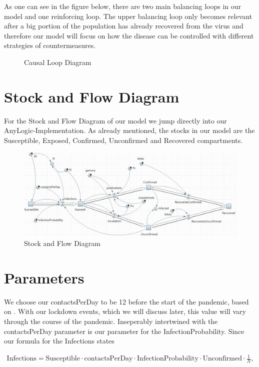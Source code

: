 \documentclass
[
    a4paper,
    11pt,
    bibliography = totoc,
    listof = totoc,
    headinclude = true,
]
{scrreport}
\begin{document}
As one can see in the figure below, there are two main balancing loops
in our model and one reinforcing loop. The upper balancing loop only
becomes relevant after a big portion of the population has already recovered
from the virus and therefore our model will focus on how the disease can
be controlled with different strategies of countermeasures.

\begin{figure}[hbt!]
  \caption{Causal Loop Diagram}
  
\end{figure}

\section{Stock and Flow Diagram}

For the Stock and Flow Diagram of our model we jump directly into
our AnyLogic-Implementation. As already mentioned, the stocks in our model
are the Susceptible, Exposed, Confirmed, Unconfirmed and Recovered compartments.

\begin{figure}[hbt!]
  \caption{Stock and Flow Diagram}
  \includegraphics[width=\linewidth]{../AnyLogicSIR.JPG}
\end{figure}

\FloatBarrier

\section{Parameters}

We choose our contactsPerDay to be 12 before the start of the pandemic,
based on \cite{Spiegel}. With our lockdown events, which we will discuss
later, this value will vary through the course of the pandemic.
Inseperably intertwined with the contactsPerDay parameter is our parameter
for the InfectionProbability. Since our formula for the Infections states

\begin{align*}
  \text{Infections} = \text{Susceptible} \cdot \text{contactsPerDay} \cdot
  \text{InfectionProbability} \cdot
  \text{Unconfirmed} \cdot \frac{1}{N},
\end{align*}
\end{document}
